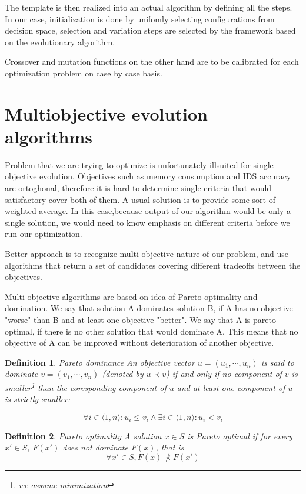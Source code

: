 \documentclass[12pt,oneside]{fithesis2}
\newtheorem{defn}{Definition}
\begin{document}
The template is then realized into an actual algorithm by defining all the steps. In our case, initialization is done by unifomly selecting configurations from decision space, selection and variation steps are selected by the framework based on the evolutionary algorithm. 

Crossover and mutation functions on the other hand are to be calibrated for each optimization problem on case by case basis.

\section{Multiobjective evolution algorithms}
Problem that we are trying to optimize is unfortunately illsuited for single objective evolution. Objectives such as memory consumption and IDS accuracy are ortoghonal, therefore it is hard to determine single criteria that would satisfactory cover both of them. A usual solution is to provide some sort of weighted average. In this case,because output of our algorithm would be only a single solution, we would need to know emphasis on different criteria before we run our optimization. 

Better approach is to recognize multi-objective nature of our problem, and use algorithms that return a set of candidates covering different tradeoffs between the objectives. 

Multi objective algorithms are based on idea of Pareto optimality and domination. We say that solution A dominates solution B, if A has no objective "worse" than B and at least one objective "better". We say that A is pareto-optimal, if there is no other solution that would dominate A. This means that no objective of A can be improved without deterioration of another objective. 

\begin{defn}{Pareto dominance}
An objective vector $u = (u_1,\cdots,u_n)$ is said to dominate $v = (v_1,\cdots,v_n)$ (denoted by $u \prec v$) if and only if no component of $v$ is smaller\footnote{we assume minimization} than the coresponding component of $u$ and at least one component of $u$ is strictly smaller:

$$ \forall i \in \langle 1,n\rangle: u_i \leq v_i \land \exists i \in \langle 1,n\rangle: u_i < v_i $$
\end{defn}

\begin{defn}{Pareto optimality}
A solution $x \in S$ is Pareto optimal if for every $x' \in S$, $F(x')$ does not dominate $F(x)$, that is $$ \forall x' \in S, F(x) \not \prec F(x') $$
\end{defn}
\end{document}
